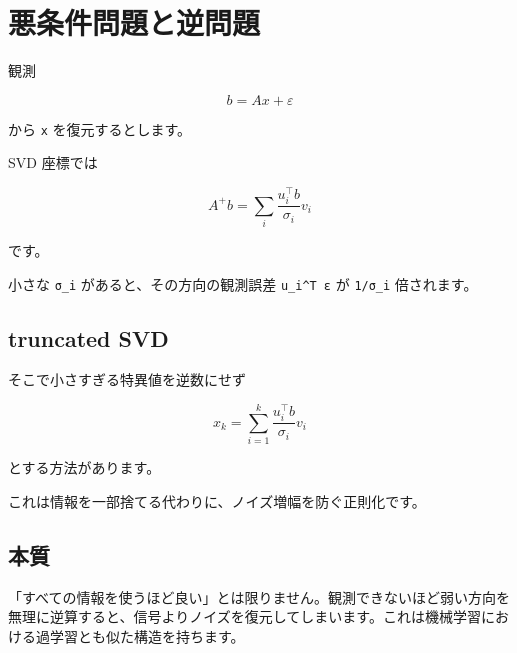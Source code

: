 \documentclass[
  11pt,
  a4paper,
]{ltjsarticle}
\author{}
\date{}
\begin{document}
\hypertarget{ux60aaux6761ux4ef6ux554fux984cux3068ux9006ux554fux984c}{%
\section{悪条件問題と逆問題}\label{ux60aaux6761ux4ef6ux554fux984cux3068ux9006ux554fux984c}}

観測

\[
b=Ax+\varepsilon
\]

から \texttt{x} を復元するとします。

SVD 座標では

\[
A^+b=\sum_i\frac{u_i^\top b}{\sigma_i}v_i
\]

です。

小さな \texttt{σ\_i} があると、その方向の観測誤差 \texttt{u\_i\^{}T\ ε}
が \texttt{1/σ\_i} 倍されます。

\hypertarget{truncated-svd}{%
\subsection{truncated SVD}\label{truncated-svd}}

そこで小さすぎる特異値を逆数にせず

\[
x_k=\sum_{i=1}^k\frac{u_i^\top b}{\sigma_i}v_i
\]

とする方法があります。

これは情報を一部捨てる代わりに、ノイズ増幅を防ぐ正則化です。

\hypertarget{ux672cux8cea}{%
\subsection{本質}\label{ux672cux8cea}}

「すべての情報を使うほど良い」とは限りません。観測できないほど弱い方向を無理に逆算すると、信号よりノイズを復元してしまいます。これは機械学習における過学習とも似た構造を持ちます。
\end{document}
